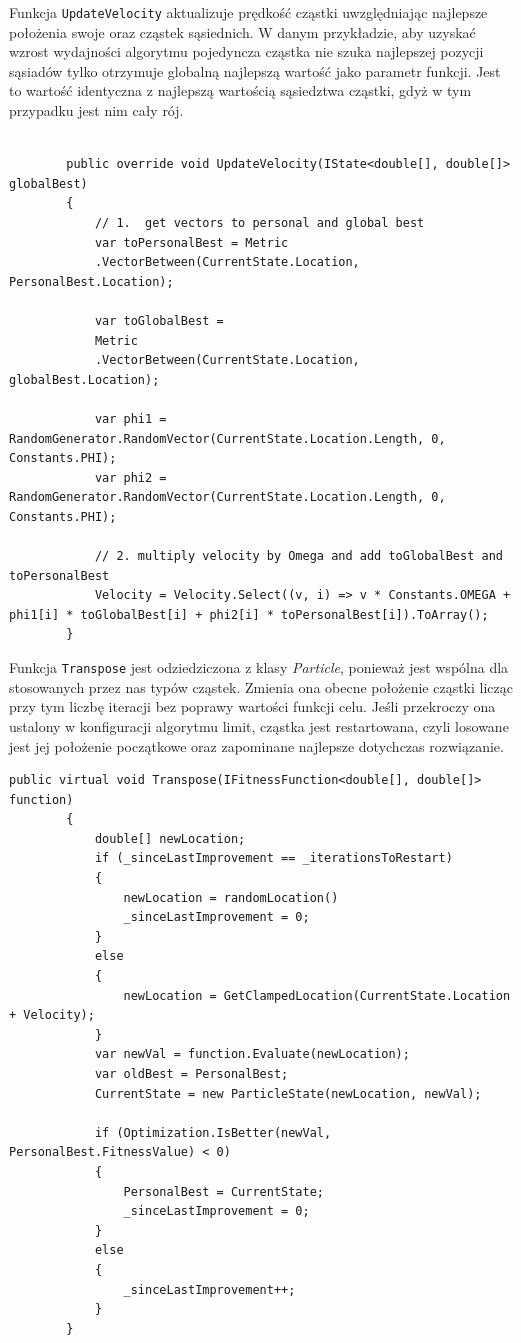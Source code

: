\documentclass[12pt, twoside, openany, abstract=on]{report}
\theoremstyle{definition}
\begin{document}
Funkcja \texttt{UpdateVelocity} aktualizuje prędkość cząstki uwzględniając najlepsze położenia swoje oraz cząstek sąsiednich. W danym przykładzie, aby uzyskać wzrost wydajności algorytmu pojedyncza cząstka nie szuka najlepszej pozycji sąsiadów tylko otrzymuje globalną najlepszą wartość jako parametr funkcji. Jest to wartość identyczna z najlepszą wartością sąsiedztwa cząstki, gdyż w tym przypadku jest nim cały rój.

\lstset{style=sharpc}
\begin{lstlisting}[frame=single]

        public override void UpdateVelocity(IState<double[], double[]> globalBest)
        {
            // 1.  get vectors to personal and global best
            var toPersonalBest = Metric
            .VectorBetween(CurrentState.Location, PersonalBest.Location);
            
            var toGlobalBest = 
            Metric
            .VectorBetween(CurrentState.Location, globalBest.Location);

            var phi1 = RandomGenerator.RandomVector(CurrentState.Location.Length, 0, Constants.PHI);
            var phi2 = RandomGenerator.RandomVector(CurrentState.Location.Length, 0, Constants.PHI);

            // 2. multiply velocity by Omega and add toGlobalBest and toPersonalBest
            Velocity = Velocity.Select((v, i) => v * Constants.OMEGA + phi1[i] * toGlobalBest[i] + phi2[i] * toPersonalBest[i]).ToArray();
        }

\end{lstlisting}

Funkcja \texttt{Transpose} jest odziedziczona z klasy \textit{Particle}, ponieważ jest wspólna dla stosowanych przez nas typów cząstek. Zmienia ona obecne położenie cząstki licząc przy tym liczbę iteracji bez poprawy wartości funkcji celu. Jeśli przekroczy ona ustalony w konfiguracji algorytmu limit, cząstka jest restartowana, czyli losowane jest jej położenie początkowe oraz zapominane najlepsze dotychczas rozwiązanie.

\lstset{style=sharpc}
\begin{lstlisting}[frame=single]
public virtual void Transpose(IFitnessFunction<double[], double[]> function)
        {
            double[] newLocation;
            if (_sinceLastImprovement == _iterationsToRestart)
            {
                newLocation = randomLocation()
                _sinceLastImprovement = 0;
            }
            else
            {
                newLocation = GetClampedLocation(CurrentState.Location + Velocity);
            }
            var newVal = function.Evaluate(newLocation);
            var oldBest = PersonalBest;
            CurrentState = new ParticleState(newLocation, newVal);

            if (Optimization.IsBetter(newVal, PersonalBest.FitnessValue) < 0)
            {
                PersonalBest = CurrentState;
                _sinceLastImprovement = 0;
            }
            else
            {
                _sinceLastImprovement++;
            }
        }
\end{lstlisting}
\end{document}
